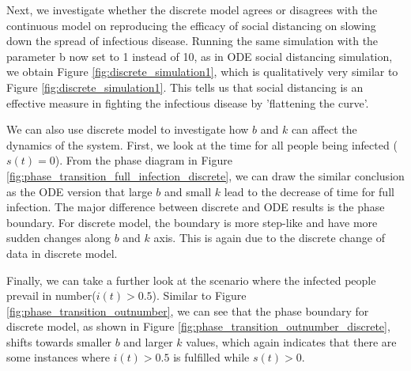 \documentclass[12pt, reqno]{amsart}
\begin{document}
    

    
    Next, we investigate whether the discrete model agrees or disagrees with the continuous model on reproducing the efficacy of social distancing on slowing down the spread of infectious disease. Running the same simulation with the parameter b now set to 1 instead of 10, as in ODE social distancing simulation, we obtain Figure \ref{fig:discrete_simulation1}, which is qualitatively very similar to Figure \ref{fig:discrete_simulation1}. This tells us that social distancing is an effective measure in fighting the infectious disease by 'flattening the curve'.

    
    We can also use discrete model to investigate how \(b\) and \(k\) can affect the dynamics of the system. First, we look at the time for all people being infected ($s(t) = 0$). From the phase diagram in Figure \ref{fig:phase_transition_full_infection_discrete}, we can draw the similar conclusion as the ODE version that large \(b\) and small \(k\) lead to the decrease of time for full infection. The major difference between discrete and ODE results is the phase boundary. For discrete model, the boundary is more step-like and have more sudden changes along \(b\) and \(k\) axis. This is again due to the discrete change of data in discrete model. 
    
    
   Finally, we can take a further look at the scenario where the infected people prevail in number($i(t) > 0.5$). Similar to Figure \ref{fig:phase_transition_outnumber}, we can see that the phase boundary for discrete model, as shown in Figure \ref{fig:phase_transition_outnumber_discrete}, shifts towards smaller \(b\) and larger \(k\) values, which again indicates that there are some instances where $i(t) > 0.5$ is fulfilled while $s(t) > 0$.
    
\end{document}
